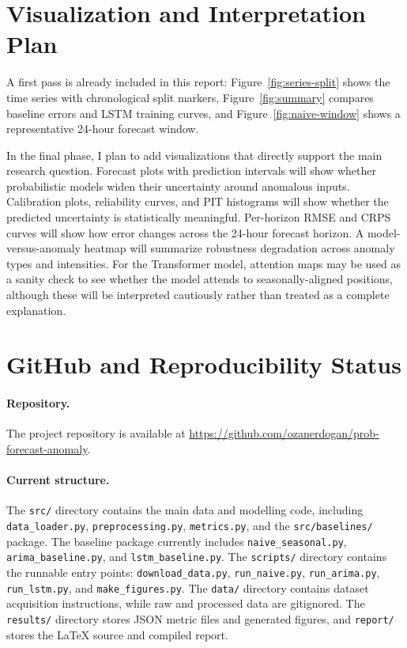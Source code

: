 \documentclass[11pt,a4paper]{article}
\begin{document}
\section{Visualization and Interpretation Plan}

A first pass is already included in this report:
Figure~\ref{fig:series-split} shows the time series with chronological split
markers, Figure~\ref{fig:summary} compares baseline errors and LSTM training
curves, and Figure~\ref{fig:naive-window} shows a representative 24-hour
forecast window.

In the final phase, I plan to add visualizations that directly support the
main research question. Forecast plots with prediction intervals will show
whether probabilistic models widen their uncertainty around anomalous inputs.
Calibration plots, reliability curves, and PIT histograms will show whether
the predicted uncertainty is statistically meaningful. Per-horizon RMSE and
CRPS curves will show how error changes across the 24-hour forecast horizon.
A model-versus-anomaly heatmap will summarize robustness degradation across
anomaly types and intensities. For the Transformer model, attention maps may
be used as a sanity check to see whether the model attends to
seasonally-aligned positions, although these will be interpreted cautiously
rather than treated as a complete explanation.

\section{GitHub and Reproducibility Status}

\paragraph{Repository.}
The project repository is available at
\url{https://github.com/ozanerdogan/prob-forecast-anomaly}.

\paragraph{Current structure.}
The \texttt{src/} directory contains the main data and modelling code,
including \texttt{data\_loader.py}, \texttt{preprocessing.py},
\texttt{metrics.py}, and the \texttt{src/baselines/} package. The baseline
package currently includes \texttt{naive\_seasonal.py},
\texttt{arima\_baseline.py}, and \texttt{lstm\_baseline.py}.
The \texttt{scripts/} directory contains the runnable entry points:
\texttt{download\_data.py}, \texttt{run\_naive.py},
\texttt{run\_arima.py}, \texttt{run\_lstm.py}, and
\texttt{make\_figures.py}. The \texttt{data/} directory contains
dataset acquisition instructions, while raw and processed data are
gitignored. The \texttt{results/} directory stores JSON metric files
and generated figures, and \texttt{report/} stores the LaTeX source and
compiled report.
\end{document}
